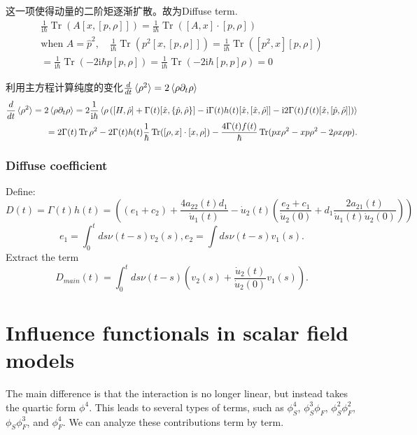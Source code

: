 \documentclass{article}
\begin{document}
    这一项使得动量的二阶矩逐渐扩散。故为Diffuse term.
    \begin{align*}
        \frac{1}{\mathrm{i}\hbar}\operatorname{Tr}(A[x,[p,\rho]])= \frac{1}{\mathrm{i}\hbar}\operatorname{Tr}([A,x]\cdot[p,\rho])\\
        \text{when }A=\hat{p}^2,\quad \frac{1}{\mathrm{i}\hbar}\operatorname{Tr}(p^2[x,[p,\rho]])=\frac{1}{\mathrm{i}\hbar}\operatorname{Tr}([p^2,x][p,\rho])\\
        =\frac{1}{\mathrm{i}\hbar}\operatorname{Tr}(-2 \mathrm{i}\hbar p[p,\rho])=\frac{1}{\mathrm{i}\hbar}\operatorname{Tr}(-2 \mathrm{i}\hbar [p,p]\rho)=0
    \end{align*}
    
利用主方程计算纯度的变化$\frac{d}{dt}\braket{\rho^2}=2\braket{\rho\partial_t\rho}$
    \begin{align*}
        \frac{d}{dt}\braket{\rho^2}=2\braket{\rho\partial_t\rho}=2\frac{1}{\mathrm{i}\hbar}\braket{\rho\left([H,\hat{\rho}]+\Gamma(t)[\hat{x},\{\hat{p},\hat{\rho}\}]-\mathrm{i}\Gamma(t)h(t)[\hat{x},[\hat{x},\hat{\rho}]]-\mathrm{i}2\Gamma(t)f(t)[\hat{x},[\hat{p},\hat{\rho}]]\right)}\\
        =2\Gamma(t)\operatorname{Tr}\rho^2-2\Gamma(t)h(t)\frac{1}{\hbar}\operatorname{Tr}([\rho,x]\cdot[x,\rho])-\frac{4\Gamma(t)f(t)}{\hbar}\operatorname{Tr}(px\rho^2-xp\rho^2-2\rho x\rho p).
    \end{align*}
\subsubsection{Diffuse coefficient}
Define:
\begin{equation}
    D(t)=\Gamma(t)h(t)=\left((e_1+c_2)+\frac{4a_{22}(t)d_1}{\dot{u}_1(t)}-\dot{u}_2(t)(\frac{e_2+c_1}{\dot{u}_2(0)}+d_1\frac{2a_{21}(t)}{\dot{u}_1(t)\dot{u}_2(0)})\right)
\end{equation}
$$e_1=\int_0^t ds\nu(t-s)v_2(s),e_2=\int ds\nu(t-s)v_1(s).$$
Extract the term 
$$D_{main}(t)=\int_0^tds\nu(t-s)\left(v_2(s)+\frac{\dot{u}_2(t)}{\dot{u}_2(0)}v_1(s)\right).$$
\section{Influence functionals in scalar field models}
The main difference is that the interaction is no longer linear, but instead takes the quartic form $\phi^4$. 
This leads to several types of terms, such as 
$\phi_S^4$, $\phi_S^3\phi_F$, $\phi_S^2\phi_F^2$, $\phi_S\phi_F^3$, and $\phi_F^4$. 
We can analyze these contributions term by term. 
\end{document}

